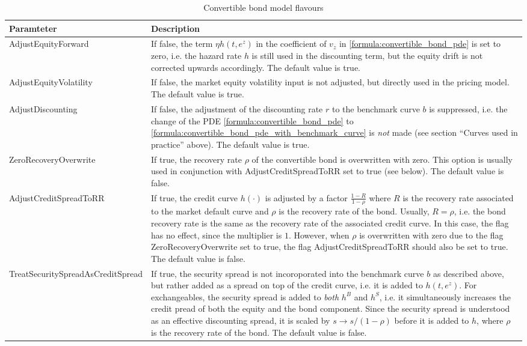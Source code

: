 \begin{table}[h]
  \begin{tabular}{p{5cm}|p{11cm}}
    Paramteter & Description \\
    \hline
    AdjustEquityForward & If false, the term $\eta h(t,e^z)$ in the coefficient of
    $v_z$ in \ref{formula:convertible_bond_pde} is set to zero, i.e. the hazard rate $h$ is still used in the
    discounting term, but the equity drift is not corrected upwards accordingly. The default value is true. \\ \hline

    AdjustEquityVolatility & If false, the market equity volatility input is not adjusted, but directly used in the
    pricing model. The default value is true. \\ \hline

    AdjustDiscounting & If false, the adjustment of the discounting rate $r$ to the benchmark curve $b$ is suppressed,
    i.e. the change of the PDE \ref{formula:convertible_bond_pde} to
    \ref{formula:convertible_bond_pde_with_benchmark_curve} is {\em not} made (see section ``Curves used in practice''
    above). The default value is true. \\ \hline

    ZeroRecoveryOverwrite & If true, the recovery rate $\rho$ of the convertible
    bond is overwritten with zero. This option is usually used in conjunction with AdjustCreditSpreadToRR set to true
    (see below). The default value is false. \\ \hline

    AdjustCreditSpreadToRR & If true, the credit curve $h(\cdot)$ is adjusted by a factor $\frac{1-R}{1-\rho}$ where $R$
    is the recovery rate associated to the market default curve and $\rho$ is the recovery rate of the bond. Usually,
    $R=\rho$, i.e. the bond recovery rate is the same as the recovery rate of the associated credit curve. In this case,
    the flag has no effect, since the multiplier is $1$. However, when $\rho$ is overwritten with zero due to the flag
    ZeroRecoveryOverwrite set to true, the flag AdjustCreditSpreadToRR should also be set to true. The default value is
    false. \\ \hline

    TreatSecuritySpreadAsCreditSpread & If true, the security spread is not incoroporated into the benchmark curve $b$
    as described above, but rather added as a spread on top of the credit curve, i.e. it is added to $h(t,e^z)$. For
    exchangeables, the security spread is added to {\em both} $h^B$ and $h^S$, i.e. it simultaneously increases the credit
    pread of both the equity and the bond component. Since the security spread is understood as an effective discounting spread,
    it is scaled by $s \rightarrow s / (1-\rho)$ before it is added to $h$, where $\rho$ is the recovery rate of the bond.
    The default value is false. \\ \hline
  \end{tabular}
  \caption{Convertible bond model flavours}
  \label{tab:convertiblebond_model_flavours}
\end{table}

